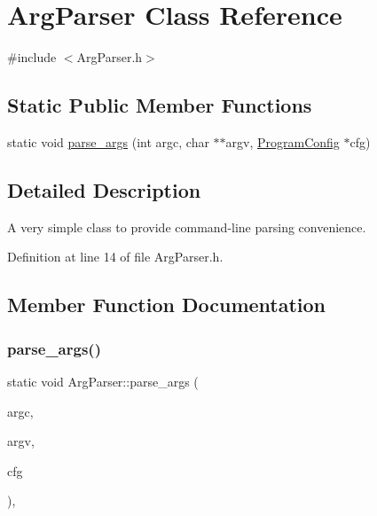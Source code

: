 \hypertarget{class_arg_parser}{}\section{Arg\+Parser Class Reference}
\label{class_arg_parser}


{\ttfamily \#include $<$Arg\+Parser.\+h$>$}

\subsection*{Static Public Member Functions}
\begin{DoxyCompactItemize}
\item 
static void \hyperlink{class_arg_parser_a19d3736d53f740bd60967b98990302c2}{parse\+\_\+args} (int argc, char $\ast$$\ast$argv, \hyperlink{struct_program_config}{Program\+Config} $\ast$cfg)
\end{DoxyCompactItemize}


\subsection{Detailed Description}
A very simple class to provide command-\/line parsing convenience. 

Definition at line 14 of file Arg\+Parser.\+h.



\subsection{Member Function Documentation}
\mbox{\label{class_arg_parser_a19d3736d53f740bd60967b98990302c2}} 
\subsubsection{\texorpdfstring{parse\+\_\+args()}{parse\_args()}}
{\footnotesize\ttfamily static void Arg\+Parser\+::parse\+\_\+args (\begin{DoxyParamCaption}\item[{int}]{argc,  }\item[{char $\ast$$\ast$}]{argv,  }\item[{\hyperlink{struct_program_config}{Program\+Config} $\ast$}]{cfg }\end{DoxyParamCaption})\hspace{0.3cm}{\ttfamily [inline]}, {\ttfamily [static]}}

